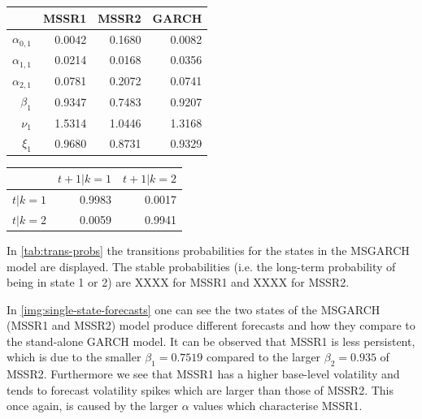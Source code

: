 \documentclass[11pt,a4paper]{article}
\begin{document}
\vspace{0.5cm}
\begin{minipage}[c]{0.5\textwidth}
	\begin{tabular}{rrrr}
		\hline
		& MSSR1 & MSSR2 & GARCH \\ 
		\hline
		$\alpha_{0,1}$ & 0.0042 & 0.1680 & 0.0082 \\ 
		$\alpha_{1,1}$ & 0.0214 & 0.0168 & 0.0356 \\ 
		$\alpha_{2,1}$ & 0.0781 & 0.2072 & 0.0741 \\ 
		$\beta_1$ & 0.9347 & 0.7483 & 0.9207 \\ 
		$\nu_1$ & 1.5314 & 1.0446 & 1.3168 \\ 
		$\xi_1$ & 0.9680 & 0.8731 & 0.9329 \\ 
		\hline
	\end{tabular}
	 \label{tab:model-params}
\end{minipage}
\begin{minipage}[c]{0.5\textwidth}
	\begin{tabular}{lrr} 
		\hline
		& $t+1 | k=1$ & $t+1 | k=2$ \\
		\hline
		$t | k=1$ & 0.9983 & 0.0017 \\
		$t | k=2$ & 0.0059 & 0.9941 \\
		\hline
	\end{tabular}
 	\label{tab:trans-probs}
\end{minipage}
\vspace{0.5cm}

In \cref{tab:trans-probs} the transitions probabilities for the states in the MSGARCH model are displayed. The stable probabilities (i.e. the long-term probability of being in state 1 or 2) are XXXX for MSSR1 and XXXX for MSSR2.

In \cref{img:single-state-forecasts} one can see the two states of the MSGARCH (MSSR1 and MSSR2) model produce different forecasts and how they compare to the stand-alone GARCH model. 
It can be observed that MSSR1 is less persistent, which is due to the smaller $\beta_1 = 0.7519$ compared to the larger $\beta_2 = 0.935$ of MSSR2.
Furthermore we see that MSSR1 has a higher base-level volatility and tends to forecast volatility spikes which are larger than those of MSSR2. This once again, is caused by the larger $\alpha$ values which characterise MSSR1.
\end{document}
